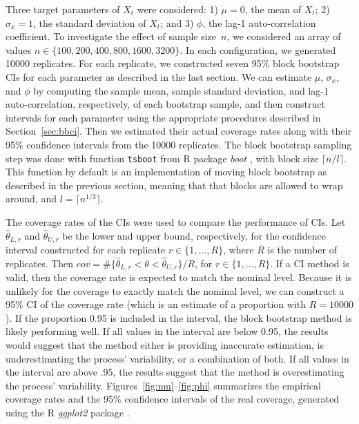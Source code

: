 \documentclass[12pt, letterpaper, titlepage]{article}
\begin{document}
Three target parameters of $X_t$ were considered:
1) $\mu = 0$, the mean of $X_t$;
2) $\sigma_x = 1$, the standard deviation of $X_t$; and
3) $\phi$, the lag-1 auto-correlation coefficient.
To investigate the effect of sample size~$n$, we considered an array of values
$n \in \{100, 200, 400, 800, 1600, 3200\}$. In each configuration, we
generated 10000 replicates. For each replicate, we constructed seven 95\% block
bootstrap CIs for each parameter as described in the last section. We can
estimate $\mu$, $\sigma_x$, and $\phi$ by computing the sample mean, sample 
standard deviation, and lag-1 auto-correlation, respectively, of each
bootstrap sample, and then construct intervals for each parameter using the
appropriate procedures described in Section~\ref{sec:bbci}. Then we estimated
their actual coverage rates along with their 95\% confidence intervals from
the 10000 replicates. The block bootstrap sampling step was done with function
\texttt{tsboot} from R package \textsl{boot} \citep{boot}, with block size
$\lceil n / l \rceil$. This function by default is an implementation of moving
block bootstrap as described in the previous section, meaning that that blocks
are allowed to wrap around, and $l = \lceil n^{1/3} \rceil$.


The coverage rates of the CIs were used to compare the performance of CIs. Let
$\hat\theta_{L, r}$ and $\hat\theta_{U, r}$ be the lower and upper bound,
respectively, for the confidence interval constructed for each replicate
$r \in \{1, \ldots, R\}$, where $R$ is the number of replicates. Then
$cov = \#\{\hat\theta_{L, r} < \theta < \hat\theta_{U, r} \}/R$, for
$r \in \{1, \ldots, R\}$. If a CI method is valid, then the coverage rate is
expected to match the nominal level. Because it is unlikely for the coverage
to exactly match the nominal level, we can construct a 95\% CI of the coverage
rate (which is an estimate of a proportion with $R = 10000$). If the proportion
0.95 is included in the interval, the block bootstrap method is likely
performing well. If all values in the interval are below 0.95, the results
would suggest that the method either is providing inaccurate estimation, is
underestimating the process' variability, or a combination of both. If all
values in the interval are above .95, the results suggest that the method is
overestimating the process' variability. Figures~\ref{fig:mu}--\ref{fig:phi}
summarizes the empirical coverage rates and the 95\% confidence intervals of
the real coverage, generated using the R \textsl{ggplot2} package
\citep{ggplot2}.
\end{document}
